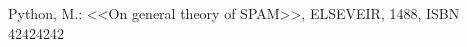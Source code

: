 \documentclass[12pt,a4paper,fleqn]{article}
\begin{document}
\begin{thebibliography}{9}
 Python, M.: <<On general theory of SPAM>>, ELSEVEIR, 1488, ISBN 42424242
\end{thebibliography}
\end{document}
